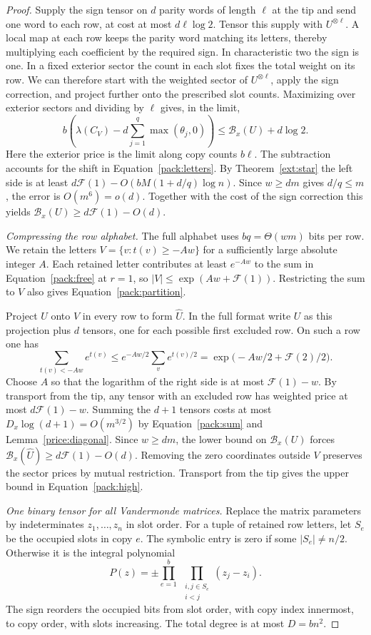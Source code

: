 \begin{proof}
Supply the sign tensor on $d$ parity words of length $\ell$ at the
tip and send one word to each row, at cost at most $d\ell\log 2$.
Tensor this supply with $U^{\otimes\ell}$. A local map at each row
keeps the parity word matching its letters, thereby multiplying each
coefficient by the required sign. In characteristic two the sign is
one. In a fixed exterior sector the count in each slot fixes the total
weight on its row. We can therefore start with the weighted sector
of $U^{\otimes\ell}$, apply the sign correction, and project further
onto the prescribed slot counts. Maximizing over exterior sectors and
dividing by $\ell$ gives, in the limit,
\[
 b\left(\lambda(C_V)-d\sum_{j=1}^{q}\max(\theta_j,0)\right)
 \le \mathcal B_x(U)+d\log 2 .
\]
Here the exterior price is the limit along copy counts $b\ell$. The
subtraction accounts for the shift in Equation~\eqref{pack:letters}.
By Theorem~\ref{ext:star} the left side is at least
$d\mathcal F(1)-O(bM(1+d/q)\log n)$. Since $w\ge dm$ gives
$d/q\le m$, the error is $O(m^6)=o(d)$. Together with the cost of the
sign correction this yields $\mathcal B_x(U)\ge d\mathcal F(1)-O(d)$.

\smallskip
\noindent\emph{Compressing the row alphabet.}
The full alphabet uses $bq=\Theta(wm)$ bits per row. We retain the
letters $V=\{v:t(v)\ge-Aw\}$ for a sufficiently large absolute
integer $A$. Each retained letter contributes at least $e^{-Aw}$ to
the sum in Equation~\eqref{pack:free} at $r=1$, so
$|V|\le\exp(Aw+\mathcal F(1))$. Restricting the sum to $V$ also gives
Equation~\eqref{pack:partition}.

Project $U$ onto $V$ in every row to form $\widehat U$. In the full
format write $U$ as this projection plus $d$ tensors, one for each
possible first excluded row. On such a row one has
\[
 \sum_{t(v)<-Aw} e^{t(v)}
  \le e^{-Aw/2}\sum_v e^{t(v)/2}
  =\exp\big(-Aw/2+\mathcal F(2)/2\big).
\]
Choose $A$ so that the logarithm of the right side is at most
$\mathcal F(1)-w$. By transport from the tip, any tensor with an
excluded row has weighted price at most $d\mathcal F(1)-w$. Summing
the $d+1$ tensors costs at most $D_x\log(d+1)=O(m^{3/2})$ by
Equation~\eqref{pack:sum} and Lemma~\ref{price:diagonal}. Since
$w\ge dm$, the lower bound on $\mathcal B_x(U)$ forces
$\mathcal B_x(\widehat U)\ge d\mathcal F(1)-O(d)$. Removing the zero
coordinates outside $V$ preserves the sector prices by mutual
restriction. Transport from the tip gives the upper bound in
Equation~\eqref{pack:high}.

\smallskip
\noindent\emph{One binary tensor for all Vandermonde matrices.}
Replace the matrix parameters by indeterminates $z_1,\ldots,z_n$ in
slot order. For a tuple of retained row letters, let $S_e$ be the
occupied slots in copy $e$. The symbolic entry is zero if some
$|S_e|\ne n/2$. Otherwise it is the integral polynomial
\[
 P(z)=\pm\prod_{e=1}^b\
      \prod_{\substack{i,j\in S_e\\i<j}}(z_j-z_i).
\]
The sign reorders the occupied bits from slot order, with copy index
innermost, to copy order, with slots increasing. The total degree is
at most $D=bn^2$.


\end{proof}

